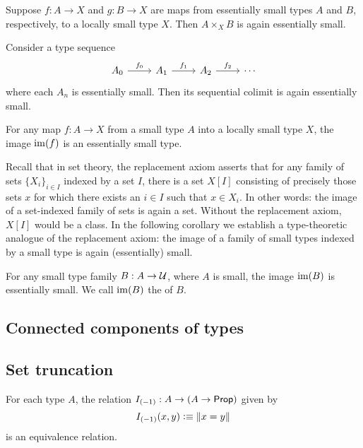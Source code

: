 \begin{cor}
Suppose $f:A\to X$ and $g:B\to X$ are maps from essentially small types $A$ and $B$, respectively, to a locally small type $X$. Then $A\times_X B$ is again essentially small. 
\end{cor}

\begin{lem}
Consider a type sequence
\begin{equation*}
\begin{tikzcd}
A_0 \arrow[r,"f_0"] & A_1 \arrow[r,"f_1"] & A_2 \arrow[r,"f_2"] & \cdots
\end{tikzcd}
\end{equation*}
where each $A_n$ is essentially small. Then its sequential colimit is again essentially small. 
\end{lem}

\begin{thm}
For any map $f:A\to X$ from a small type $A$ into a locally small type $X$, the image $\operatorname{im}(f)$ is an essentially small type.
\end{thm}

Recall that in set theory, the replacement axiom asserts that for any family of sets $\{X_i\}_{i\in I}$ indexed by a set $I$, there is a set $X[I]$ consisting of precisely those sets $x$ for which there exists an $i\in I$ such that $x\in X_i$. In other words: the image of a set-indexed family of sets is again a set. Without the replacement axiom, $X[I]$ would be a class. In the following corollary we establish a type-theoretic analogue of the replacement axiom: the image of a family of small types indexed by a small type is again (essentially) small.

\begin{cor}\label{cor:im_small}
For any small type family $B:A\to\mathcal{U}$, where $A$ is small, the image $\operatorname{im}(B)$ is essentially small. We call $\operatorname{im}(B)$ the  of $B$. 
\end{cor}

\subsection{Connected components of types}

\subsection{Set truncation}

\begin{lem}
For each type $A$, the relation $I_{(-1)}:A\to (A\to\mathsf{Prop})$ given by
\begin{equation*}
I_{(-1)}(x,y)\vcentcolon\equiv\Vert x=y\Vert_{}
\end{equation*}
is an equivalence relation.
\end{lem}

